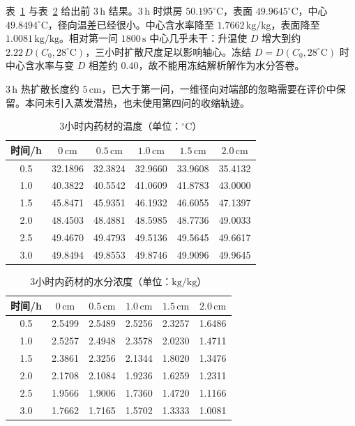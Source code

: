 表~\ref{tab:q2T} 与表~\ref{tab:q2C} 给出前 $3\,\mathrm{h}$ 结果。$3\,\mathrm{h}$ 时烘房 $50.195^\circ\mathrm{C}$，表面 $49.9645^\circ\mathrm{C}$，中心 $49.8494^\circ\mathrm{C}$，径向温差已经很小。中心含水率降至 $1.7662\,\mathrm{kg/kg}$，表面降至 $1.0081\,\mathrm{kg/kg}$。相对第一问 $1800\,\mathrm{s}$ 中心几乎未干：升温使 $D$ 增大到约 $2.22\,D(C_0,28^\circ\mathrm{C})$，三小时扩散尺度足以影响轴心。冻结 $D=D(C_0,28^\circ\mathrm{C})$ 时中心含水率与变 $D$ 相差约 $0.40$，故不能用冻结解析解作为水分答卷。

$3\,\mathrm{h}$ 热扩散长度约 $5\,\mathrm{cm}$，已大于第一问，一维径向对端部的忽略需要在评价中保留。本问未引入蒸发潜热，也未使用第四问的收缩轨迹。

\begin{table}[htbp]
\centering
\caption{3小时内药材的温度（单位：$^\circ\mathrm{C}$）}
\label{tab:q2T}
\begin{tabular}{cccccc}
\toprule
时间/h & $0\,\mathrm{cm}$ & $0.5\,\mathrm{cm}$ & $1.0\,\mathrm{cm}$ & $1.5\,\mathrm{cm}$ & $2.0\,\mathrm{cm}$ \\
\midrule
0.5 & 32.1896 & 32.3824 & 32.9660 & 33.9608 & 35.4132 \\
1.0 & 40.3822 & 40.5542 & 41.0609 & 41.8783 & 43.0000 \\
1.5 & 45.8471 & 45.9351 & 46.1932 & 46.6055 & 47.1397 \\
2.0 & 48.4503 & 48.4881 & 48.5985 & 48.7736 & 49.0033 \\
2.5 & 49.4670 & 49.4793 & 49.5136 & 49.5645 & 49.6617 \\
3.0 & 49.8494 & 49.8553 & 49.8746 & 49.9096 & 49.9645 \\
\bottomrule
\end{tabular}
\end{table}

\begin{table}[htbp]
\centering
\caption{3小时内药材的水分浓度（单位：$\mathrm{kg/kg}$）}
\label{tab:q2C}
\begin{tabular}{cccccc}
\toprule
时间/h & $0\,\mathrm{cm}$ & $0.5\,\mathrm{cm}$ & $1.0\,\mathrm{cm}$ & $1.5\,\mathrm{cm}$ & $2.0\,\mathrm{cm}$ \\
\midrule
0.5 & 2.5499 & 2.5489 & 2.5256 & 2.3257 & 1.6486 \\
1.0 & 2.5257 & 2.4948 & 2.3578 & 2.0230 & 1.4711 \\
1.5 & 2.3861 & 2.3256 & 2.1344 & 1.8020 & 1.3476 \\
2.0 & 2.1708 & 2.1084 & 1.9236 & 1.6259 & 1.2311 \\
2.5 & 1.9566 & 1.9006 & 1.7360 & 1.4720 & 1.1166 \\
3.0 & 1.7662 & 1.7165 & 1.5702 & 1.3333 & 1.0081 \\
\bottomrule
\end{tabular}
\end{table}
